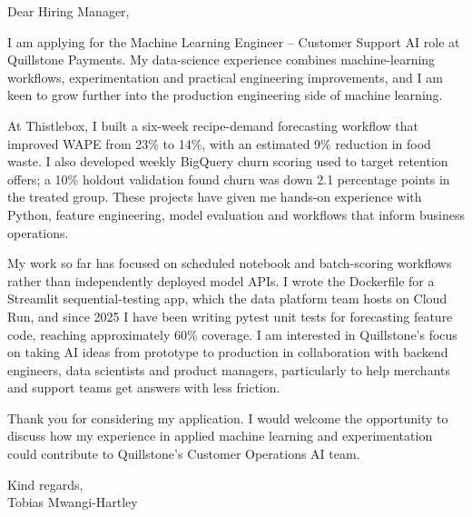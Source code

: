 \documentclass[11pt,a4paper]{article}
\begin{document}
Dear Hiring Manager,

I am applying for the Machine Learning Engineer -- Customer Support AI role at Quillstone Payments. My data-science experience combines machine-learning workflows, experimentation and practical engineering improvements, and I am keen to grow further into the production engineering side of machine learning.

At Thistlebox, I built a six-week recipe-demand forecasting workflow that improved WAPE from 23\% to 14\%, with an estimated 9\% reduction in food waste. I also developed weekly BigQuery churn scoring used to target retention offers; a 10\% holdout validation found churn was down 2.1 percentage points in the treated group. These projects have given me hands-on experience with Python, feature engineering, model evaluation and workflows that inform business operations.

My work so far has focused on scheduled notebook and batch-scoring workflows rather than independently deployed model APIs. I wrote the Dockerfile for a Streamlit sequential-testing app, which the data platform team hosts on Cloud Run, and since 2025 I have been writing pytest unit tests for forecasting feature code, reaching approximately 60\% coverage. I am interested in Quillstone’s focus on taking AI ideas from prototype to production in collaboration with backend engineers, data scientists and product managers, particularly to help merchants and support teams get answers with less friction.

Thank you for considering my application. I would welcome the opportunity to discuss how my experience in applied machine learning and experimentation could contribute to Quillstone’s Customer Operations AI team.

Kind regards,\\
Tobias Mwangi-Hartley
\end{document}
